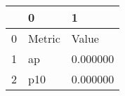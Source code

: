 \begin{tabular}{lll}
\toprule
 & 0 & 1 \\
\midrule
0 & Metric & Value \\
1 & ap & 0.000000 \\
2 & p10 & 0.000000 \\
\bottomrule
\end{tabular}
